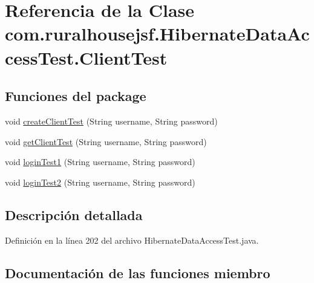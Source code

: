 \hypertarget{classcom_1_1ruralhousejsf_1_1_hibernate_data_access_test_1_1_client_test}{}\section{Referencia de la Clase com.\+ruralhousejsf.\+Hibernate\+Data\+Access\+Test.\+Client\+Test}
\label{classcom_1_1ruralhousejsf_1_1_hibernate_data_access_test_1_1_client_test}
\subsection*{Funciones del \textquotesingle{}package\textquotesingle{}}
\begin{DoxyCompactItemize}
\item 
void \mbox{\hyperlink{classcom_1_1ruralhousejsf_1_1_hibernate_data_access_test_1_1_client_test_aef561536483630370afecf4b1f974c67}{create\+Client\+Test}} (String username, String password)
\item 
void \mbox{\hyperlink{classcom_1_1ruralhousejsf_1_1_hibernate_data_access_test_1_1_client_test_a32ba702511525559a43deb719637adef}{get\+Client\+Test}} (String username, String password)
\item 
void \mbox{\hyperlink{classcom_1_1ruralhousejsf_1_1_hibernate_data_access_test_1_1_client_test_a0220519dcf8df8f3b0381d6a3b9bf949}{login\+Test1}} (String username, String password)
\item 
void \mbox{\hyperlink{classcom_1_1ruralhousejsf_1_1_hibernate_data_access_test_1_1_client_test_a7ff9002a6599de1873e9ec87e7249c3f}{login\+Test2}} (String username, String password)
\end{DoxyCompactItemize}


\subsection{Descripción detallada}


Definición en la línea 202 del archivo Hibernate\+Data\+Access\+Test.\+java.



\subsection{Documentación de las funciones miembro}
\mbox{\label{classcom_1_1ruralhousejsf_1_1_hibernate_data_access_test_1_1_client_test_aef561536483630370afecf4b1f974c67}} 
